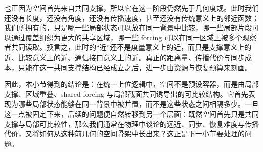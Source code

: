 也正因为空间首先来自共同支撑，所以它在这一阶段仍然先于几何度规。此时我们还没有长度，还没有角度，还没有传播速度，甚至还没有传统意义上的邻近函数；我们所拥有的，只是哪一些局部状态可以放在同一背景中比较，哪一些局部片段可以通过覆盖组织为更大的共享区域，哪一些 forcing 可以在同一区域上被多个观察者共同读取。换言之，此时的“近”还不是度量意义上的近，而只是支撑意义上的近、比较意义上的近、通信接口意义上的近。真正的距离量、传播代价与同步成本，只能在这一共同支撑结构已经成立之后，进一步由资源与恢复预算来刻画。

因此，本小节得到的结论是：在统一上位逻辑中，空间不是预设容器，而是由局部支撑、区域重叠、shared forcing 与局部截面共同诱导出的可比较结构。它首先表现为哪些局部状态能够在同一背景中被并置，而不是这些状态之间相隔多少。一旦这一点被固定下来，后续的问题便自然转移到另一个层面：既然空间首先只是共同支撑与局部可比较性，那么我们通常在物理中谈论的远近、同步、恢复难度与传播代价，又将如何从这种前几何的空间骨架中长出来？这正是下一小节要处理的问题。
